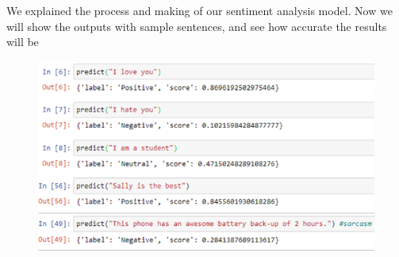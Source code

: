 

We explained the process and making of our sentiment analysis model. Now we will show the outputs with sample sentences, and see how accurate the results will be
\begin{figure}[h]
\includegraphics[scale=1.1]{results.png}
\end{figure}



